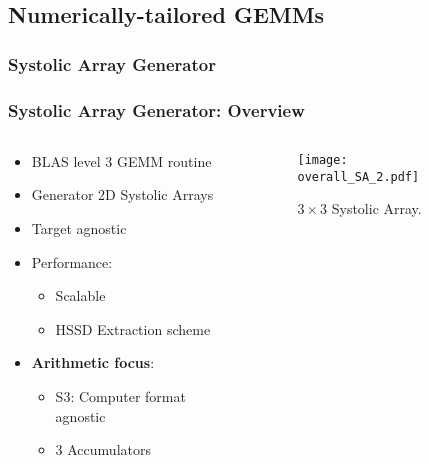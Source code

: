\subsection{Numerically-tailored GEMMs}
\subsubsection{Systolic Array Generator}
%
%

\begin{frame}
    \frametitle{Systolic Array Generator: Overview}

    \begin{columns}
        \begin{column}{0.5\textwidth}
            \begin{itemize}
                \item<1-> BLAS level 3 GEMM routine
                \item<1-> Generator 2D Systolic Arrays
                \item<1-> Target agnostic
                \item<2-> Performance:
                \begin{itemize}
		    \item Scalable
                    \item HSSD Extraction scheme
                \end{itemize}
		\item<3-> \textbf{Arithmetic focus}:
                \begin{itemize}
                    \item S3: Computer format agnostic
		    \item 3 Accumulators
                \end{itemize}
            \end{itemize}
        \end{column}

        \begin{column}{0.5\textwidth}
	    \begin{figure}[H]
            \centering
            \texttt{[image: overall\_SA\_2.pdf]}
            \caption{$3 \times 3$ Systolic Array.}
            \label{fig:overall_SA}
	    \end{figure}
        \end{column}
    \end{columns}
\end{frame}


